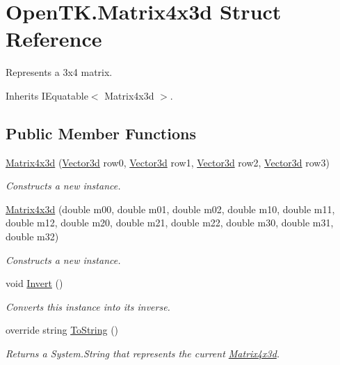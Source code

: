 \hypertarget{struct_open_t_k_1_1_matrix4x3d}{\section{Open\-T\-K.\-Matrix4x3d Struct Reference}
\label{struct_open_t_k_1_1_matrix4x3d}
}


Represents a 3x4 matrix.  




Inherits I\-Equatable$<$ Matrix4x3d $>$.

\subsection*{Public Member Functions}
\begin{DoxyCompactItemize}
\item 
\hyperlink{struct_open_t_k_1_1_matrix4x3d_a95e3cc723f886fbaa6258f705ce98c6c}{Matrix4x3d} (\hyperlink{struct_open_t_k_1_1_vector3d}{Vector3d} row0, \hyperlink{struct_open_t_k_1_1_vector3d}{Vector3d} row1, \hyperlink{struct_open_t_k_1_1_vector3d}{Vector3d} row2, \hyperlink{struct_open_t_k_1_1_vector3d}{Vector3d} row3)
\begin{DoxyCompactList}\small\item\em Constructs a new instance. \end{DoxyCompactList}\item 
\hyperlink{struct_open_t_k_1_1_matrix4x3d_a8797e1a0e53c47b6684bf38bd47f7327}{Matrix4x3d} (double m00, double m01, double m02, double m10, double m11, double m12, double m20, double m21, double m22, double m30, double m31, double m32)
\begin{DoxyCompactList}\small\item\em Constructs a new instance. \end{DoxyCompactList}\item 
void \hyperlink{struct_open_t_k_1_1_matrix4x3d_a48148dfaf1f4fcffc02d18d6ca826f6a}{Invert} ()
\begin{DoxyCompactList}\small\item\em Converts this instance into its inverse. \end{DoxyCompactList}\item 
override string \hyperlink{struct_open_t_k_1_1_matrix4x3d_ae8e17b6120cfae0020eed93c01fd2a4e}{To\-String} ()
\begin{DoxyCompactList}\small\item\em Returns a System.\-String that represents the current \hyperlink{struct_open_t_k_1_1_matrix4x3d}{Matrix4x3d}. \end{DoxyCompactList}\item 

\end{DoxyCompactItemize}
